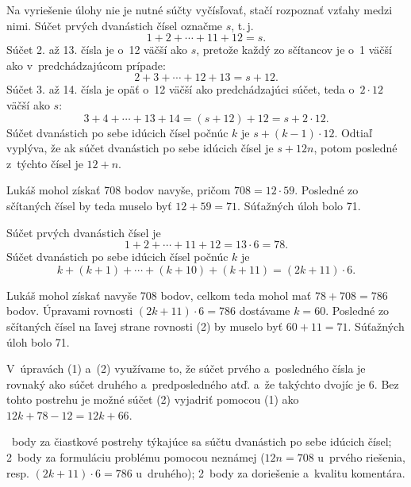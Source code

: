 {%
Na vyriešenie úlohy nie je nutné súčty vyčísľovať, stačí rozpoznať vzťahy medzi nimi.
Súčet prvých dvanástich čísel označme $s$, t.\,j.
$$
1+2+\cdots+11+12 =s.
$$
Súčet 2. až 13. čísla je o~12 väčší ako $s$, pretože každý zo sčítancov je o~1 väčší ako v~predchádzajúcom prípade:
$$
2+3+\cdots+12+13 =s+12 .
$$
Súčet 3. až 14. čísla je opäť o~12 väčší ako predchádzajúci súčet, teda o~$2\cdot 12$ väčší ako $s$:
$$
3+4+\cdots+13+14 =(s+12)+12 =s+2\cdot12 .
$$
Súčet dvanástich po sebe idúcich čísel počnúc $k$ je $s+(k-1)\cdot12$.
Odtiaľ vyplýva, že ak súčet dvanástich po sebe idúcich čísel je $s+12n$, potom posledné z~týchto čísel je $12+n$.

Lukáš mohol získať 708 bodov navyše, pričom $708=12\cdot59$.
Posledné zo sčítaných čísel by teda muselo byť $12+59=71$.
Súťažných úloh bolo 71.

\ineriesenie
Súčet prvých dvanástich čísel je
$$
1+2+\cdots+11+12 =13\cdot6 =78 . \tag{1}
$$
Súčet dvanástich po sebe idúcich čísel počnúc $k$ je
$$
k+(k+1)+\cdots+(k+10)+(k+11) =(2k+11)\cdot6 . \tag{2}
$$

Lukáš mohol získať navyše 708 bodov, celkom teda mohol mať $78+708=786$ bodov.
Úpravami rovnosti $(2k+11)\cdot6 =786$ dostávame $k=60$.
Posledné zo sčítaných čísel na ľavej strane rovnosti (2) by muselo byť $60+11=71$.
Súťažných úloh bolo 71.

\poznamka
V~úpravách (1) a~(2) využívame to, že súčet prvého a~posledného čísla je rovnaký ako súčet druhého a~predposledného atď. a~že takýchto dvojíc je 6.
Bez tohto postrehu je možné súčet (2) vyjadriť pomocou (1) ako $12k +78-12 =12k+66$.

~body za čiastkové postrehy týkajúce sa súčtu dvanástich po sebe idúcich čísel;
2~body za formuláciu problému pomocou neznámej ($12n=708$ u~prvého riešenia, resp. $(2k+11)\cdot6=786$ u~druhého);
2~body za doriešenie a~kvalitu komentára.
\endhodnotenie
}

